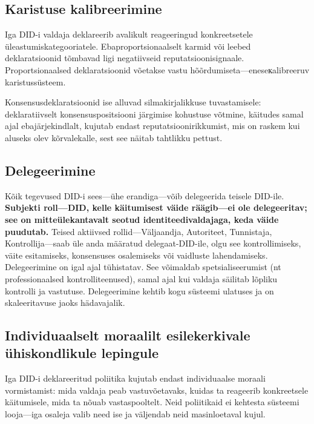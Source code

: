 \documentclass[11pt,a4paper,twocolumn]{article}
\begin{document}
\subsection{Karistuse kalibreerimine}

Iga DID-i valdaja deklareerib avalikult reageeringud konkreetsetele üleastumiskategooriatele. Ebaproportsionaalselt karmid või leebed deklaratsioonid tõmbavad ligi negatiivseid reputatsioonisignaale. Proportsionaalsed deklaratsioonid võetakse vastu hõõrdumiseta---eneseкalibreeruv karistussüsteem.

Konsensusdeklaratsioonid ise alluvad silmakirjalikkuse tuvastamisele: deklaratiivselt konsensuspositsiooni järgimise kohustuse võtmine, käitudes samal ajal ebajärjekindlalt, kujutab endast reputatsioonirikkumist, mis on raskem kui aluseks olev kõrvalekalle, sest see näitab tahtlikku pettust.

\subsection{Delegeerimine}

Kõik tegevused DID-i sees---ühe erandiga---võib delegeerida teisele DID-ile. \textbf{Subjekti roll---DID, kelle käitumisest väide räägib---ei ole delegeeritav; see on mitteülekantavalt seotud identiteedivaldajaga, keda väide puudutab.} Teised aktiivsed rollid---Väljaandja, Autoriteet, Tunnistaja, Kontrollija---saab üle anda määratud delegaat-DID-ile, olgu see kontrollimiseks, väite esitamiseks, konsensuses osalemiseks või vaidluste lahendamiseks. Delegeerimine on igal ajal tühistatav. See võimaldab spetsialiseerumist (nt professionaalsed kontrolliteenused), samal ajal kui valdaja säilitab lõpliku kontrolli ja vastutuse. Delegeerimine kehtib kogu süsteemi ulatuses ja on skaleeritavuse jaoks hädavajalik.

\subsection{Individuaalselt moraalilt esilekerkivale ühiskondlikule lepingule}

Iga DID-i deklareeritud poliitika kujutab endast individuaalse moraali vormistamist: mida valdaja peab vastuvõetavaks, kuidas ta reageerib konkreetsele käitumisele, mida ta nõuab vastaspooltelt. Neid poliitikaid ei kehtesta süsteemi looja---iga osaleja valib need ise ja väljendab neid masinloetaval kujul.
\end{document}
